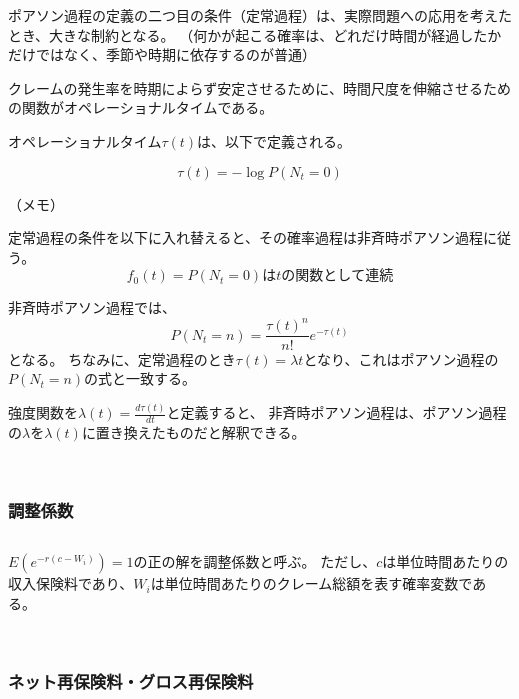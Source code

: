 \begin{sol}
$ $

ポアソン過程の定義の二つ目の条件（定常過程）は、実際問題への応用を考えたとき、大きな制約となる。
（何かが起こる確率は、どれだけ時間が経過したかだけではなく、季節や時期に依存するのが普通）

クレームの発生率を時期によらず安定させるために、時間尺度を伸縮させるための関数がオペレーショナルタイムである。

オペレーショナルタイム$\tau(t) $は、以下で定義される。

\[
  \tau(t) = - \log P(N_t = 0)
\]


\;

（メモ）

定常過程の条件を以下に入れ替えると、その確率過程は非斉時ポアソン過程に従う。
\[
  f_0(t) = P(N_t = 0)はtの関数として連続
\]

非斉時ポアソン過程では、
\[
  P(N_t = n) = \frac{\tau(t)^n}{n!} e^{-\tau(t)}
\]
となる。
ちなみに、定常過程のとき$\tau(t) = \lambda t$となり、これはポアソン過程の$P(N_t = n)$の式と一致する。

強度関数を$\displaystyle \lambda(t) = \frac{d\tau(t)}{dt}$と定義すると、
非斉時ポアソン過程は、ポアソン過程の$\lambda$を$\lambda(t)$に置き換えたものだと解釈できる。


\end{sol}

\

\newpage

\subsubsection{調整係数}

\begin{sol}

$ $

$E(e^{-r(c-W_i)}) = 1$の正の解を調整係数と呼ぶ。
ただし、$c$は単位時間あたりの収入保険料であり、$W_i$は単位時間あたりのクレーム総額を表す確率変数である。


\end{sol}

\
\newpage


\subsubsection{ネット再保険料・グロス再保険料}

